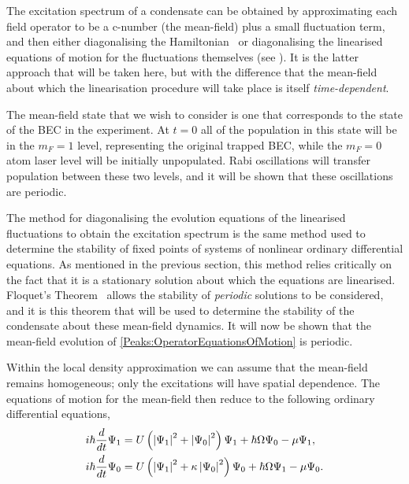 The excitation spectrum of a condensate can be obtained by approximating each field operator to be a c-number (the mean-field) plus a small fluctuation term, and then either diagonalising the Hamiltonian~\cite{Bogoliubov:1947,FetterWalecka} or diagonalising the linearised equations of motion for the fluctuations themselves (see ). It is the latter approach that will be taken here, but with the difference that the mean-field about which the linearisation procedure will take place is itself \emph{time-dependent}.

The mean-field state that we wish to consider is one that corresponds to the state of the BEC in the experiment. At $t=0$ all of the population in this state will be in the $m_F=1$ level, representing the original trapped BEC, while the $m_F=0$ atom laser level will be initially unpopulated. Rabi oscillations will transfer population between these two levels, and it will be shown that these oscillations are periodic.

The method for diagonalising the evolution equations of the linearised fluctuations to obtain the excitation spectrum is the same method used to determine the stability of fixed points of systems of nonlinear ordinary differential equations. As mentioned in the previous section, this method relies critically on the fact that it is a stationary solution about which the equations are linearised. Floquet's Theorem~\citep{AppliedNonlinearDynamics} allows the stability of \emph{periodic} solutions to be considered, and it is this theorem that will be used to determine the stability of the condensate about these mean-field dynamics. It will now be shown that the mean-field evolution of \eqref{Peaks:OperatorEquationsOfMotion} is periodic.

Within the local density approximation we can assume that the mean-field remains homogeneous; only the excitations will have spatial dependence. The equations of motion for the mean-field then reduce to the following ordinary differential equations,
\begin{subequations}
    \label{Peaks:MeanFieldEquationsOfMotion}
    \begin{align}
    i \hbar \frac{d }{dt}\Psi_1 &= U\left(\abs{\Psi_1}^2 + \abs{\Psi_0}^2\right)\Psi_1 + \hbar \Omega \Psi_0 - \mu \Psi_1,\\
    i \hbar \frac{d }{dt}\Psi_0 &= U\left(\abs{\Psi_1}^2 + \kappa \abs{\Psi_0}^2\right)\Psi_0 + \hbar \Omega \Psi_1 - \mu \Psi_0.
    \end{align}
\end{subequations}

